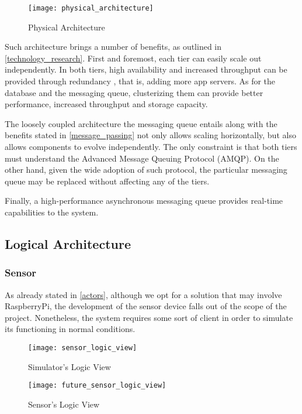 \begin{figure}[H]
	\centering
	\texttt{[image: physical\_architecture]}
	\caption{Physical Architecture}
	\label{fig:physical_architecture}
\end{figure}

Such architecture brings a number of benefits, as outlined in \ref{technology_research}. First and foremost, each tier can easily scale out independently. In both tiers, high availability and increased throughput can be provided through redundancy \cite{Antwerp}, that is, adding more app servers. As for the database and the messaging queue, clusterizing them can provide better performance, increased throughput and storage capacity.

The loosely coupled architecture the messaging queue entails along with the benefits stated in \ref{message_passing} not only allows scaling horizontally, but also allows components to evolve independently. The only constraint is that both tiers must understand the Advanced Message Queuing Protocol (AMQP). On the other hand, given the wide adoption of such protocol, the particular messaging queue may be replaced without affecting any of the tiers.

Finally, a high-performance asynchronous messaging queue provides real-time capabilities to the system.

\subsection{Logical Architecture}

\subsubsection{Sensor}

As already stated in \ref{actors}, although we opt for a solution that may involve RaspberryPi, the development of the sensor device falls out of the scope of the project. Nonetheless, the system requires some sort of client in order to simulate its functioning in normal conditions.

\begin{figure}[H]
\begin{minipage}{.5\textwidth}
	\centering
	\texttt{[image: sensor\_logic\_view]}
	\caption{Simulator's Logic View}
	\label{fig:sensor_logic_view}
\end{minipage}
\begin{minipage}{.5\textwidth}
	\centering
	\texttt{[image: future\_sensor\_logic\_view]}
	\caption{Sensor's Logic View}
	\label{fig:future_sensor_logic_view}
\end{minipage}
\end{figure}

